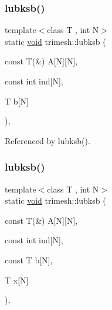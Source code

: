 \subsubsection{\texorpdfstring{lubksb()}{lubksb()}\hspace{0.1cm}{\footnotesize\ttfamily [1/2]}}
{\footnotesize\ttfamily template$<$class T , int N$>$ \\
static \hyperlink{namespacetrimesh_a784ddfd979e1c579bda795a8edfc3f43}{void} trimesh\+::lubksb (\begin{DoxyParamCaption}\item[{const T(\&)}]{A\mbox{[}\+N\mbox{]}\mbox{[}\+N\mbox{]},  }\item[{const int}]{ind\mbox{[}\+N\mbox{]},  }\item[{T}]{b\mbox{[}\+N\mbox{]} }\end{DoxyParamCaption})\hspace{0.3cm}{\ttfamily [inline]}, {\ttfamily [static]}}



Referenced by lubksb().

\mbox{\label{namespacetrimesh_a8740034e0ed162cb92b761ca7c174a26}} 
\subsubsection{\texorpdfstring{lubksb()}{lubksb()}\hspace{0.1cm}{\footnotesize\ttfamily [2/2]}}
{\footnotesize\ttfamily template$<$class T , int N$>$ \\
static \hyperlink{namespacetrimesh_a784ddfd979e1c579bda795a8edfc3f43}{void} trimesh\+::lubksb (\begin{DoxyParamCaption}\item[{const T(\&)}]{A\mbox{[}\+N\mbox{]}\mbox{[}\+N\mbox{]},  }\item[{const int}]{ind\mbox{[}\+N\mbox{]},  }\item[{const T}]{b\mbox{[}\+N\mbox{]},  }\item[{T}]{x\mbox{[}\+N\mbox{]} }\end{DoxyParamCaption})\hspace{0.3cm}{\ttfamily [inline]}, {\ttfamily [static]}}

\mbox{\label{namespacetrimesh_afbbca679f87aba5ef182bf6be56fb4d2}} 
